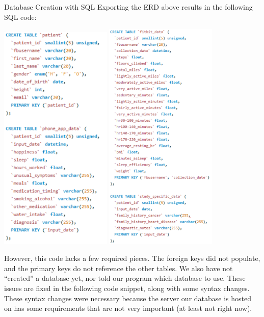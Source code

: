 \documentclass[]{book}
\begin{document}
Database Creation with SQL Exporting the ERD above results in the
following SQL code:

\includegraphics[width=0.40000\textwidth]{./images/a1.png}
\includegraphics[width=0.40000\textwidth]{./images/a2.png}

However, this code lacks a few required pieces. The foreign keys did not
populate, and the primary keys do not reference the other tables. We
also have not ``created'' a database yet, nor told our program which
database to use. These issues are fixed in the following code snippet,
along with some syntax changes. These syntax changes were necessary
because the server our database is hosted on has some requirements that
are not very important (at least not right now).
\end{document}
